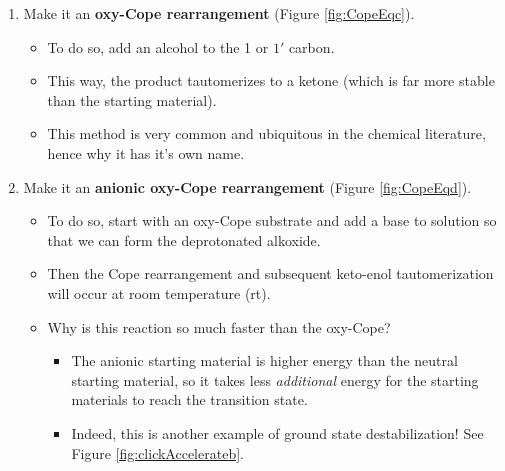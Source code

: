 \documentclass[../notes.tex]{subfiles}
\begin{document}
\begin{itemize}
\begin{enumerate}
\begin{itemize}
            \begin{itemize}
                \item Note that the newly conjugated olefin will still \emph{not} be conjugated with respect to the product olefin at the other terminal.
            \end{itemize}
            \item This is energetically favorable because it's a reduction of the number of independent alkene systems from 3 to 2.
            \item The temperature we need to run this reaction is down from the initial \SI{200}{\celsius} (Figure \ref{fig:copeRearr}) to about \SI{170}{\celsius}.
        \end{itemize}
        \item Make it an \textbf{oxy-Cope rearrangement} (Figure \ref{fig:CopeEqc}).
        \begin{itemize}
            \item To do so, add an alcohol to the 1 or $1'$ carbon.
            \item This way, the product tautomerizes to a ketone (which is far more stable than the starting material).
            \item This method is very common and ubiquitous in the chemical literature, hence why it has it's own name.
        \end{itemize}
        \item Make it an \textbf{anionic oxy-Cope rearrangement} (Figure \ref{fig:CopeEqd}).
        \begin{itemize}
            \item To do so, start with an oxy-Cope substrate and add a base to solution so that we can form the deprotonated alkoxide.
            \item Then the Cope rearrangement and subsequent keto-enol tautomerization will occur at room temperature (rt).
            \item Why is this reaction so much faster than the oxy-Cope?
            \begin{itemize}
                \item The anionic starting material is higher energy than the neutral starting material, so it takes less \emph{additional} energy for the starting materials to reach the transition state.
                \item Indeed, this is another example of ground state destabilization! See Figure \ref{fig:clickAccelerateb}.
            \end{itemize}

\end{itemize}
\end{enumerate}
\end{itemize}
\end{document}

